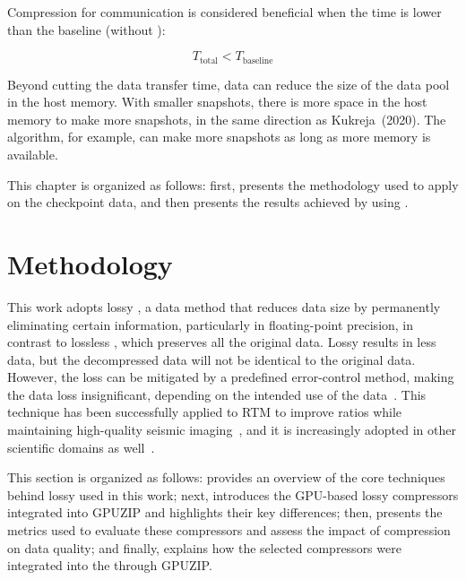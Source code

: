 \documentclass[Ingles,Final]{ic-tese-v3}
\begin{document}
Compression for communication is considered beneficial when the \compression time is lower than the baseline (without \compression):

\begin{equation}
T_{\text{total}} < T_{\text{baseline}}
\label{eq:benefit_condition}
\end{equation}

Beyond cutting the data transfer time, data \compression can reduce the size of the \checkpointing data pool in the host memory. With smaller snapshots, there is more space in the host memory to make more snapshots, in the same direction as Kukreja~\etal(2020)\cite{kukreja2020}. The \uniform algorithm, for example, can make more snapshots as long as more memory is available.

This chapter is organized as follows: first,  presents the methodology used to apply \compression on the checkpoint data, and then  presents the results achieved by using \compression. 


\section{Methodology}
\label{sec:comp_methodology}

This work adopts lossy \compression, a data \compression method that reduces data size by permanently eliminating certain information, particularly in floating-point precision, in contrast to lossless \compression, which preserves all the original data. Lossy \compression results in less data, but the decompressed data will not be identical to the original data. However, the loss can be mitigated by a predefined error-control method, making the data loss insignificant, depending on the intended use of the data~\cite{di2025}. This technique has been successfully applied to RTM to improve \compression ratios while maintaining high-quality seismic imaging~\cite{kukreja2020, di2025, barbosa2023}, and it is increasingly adopted in other scientific domains as well~\cite{liu2022,di2025}.

This section is organized as follows:  provides an overview of the core techniques behind lossy \compression used in this work; next,  introduces the GPU-based lossy compressors integrated into GPUZIP and highlights their key differences; then,  presents the metrics used to evaluate these compressors and assess the impact of compression on data quality; and finally,  explains how the selected compressors were integrated into the \awave through GPUZIP.
\end{document}
